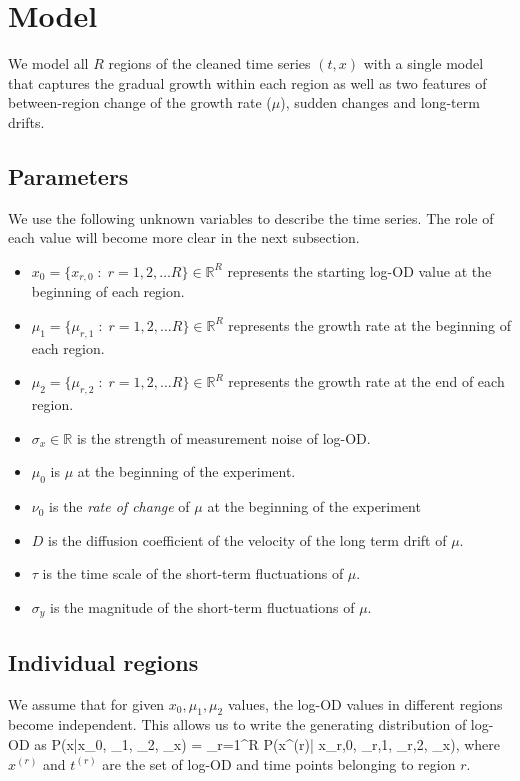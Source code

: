 \section{Model}

We model all $R$ regions of the cleaned time series $(t, x)$ with a single model that captures the gradual growth within each region as well as two features of between-region change of the growth rate ($\mu$), sudden changes and long-term drifts.

\subsection{Parameters}
We use the following unknown variables to describe the time series. The role of each value will become more clear in the next subsection.
\begin{itemize}
	\item $x_0 = \{x_{r,0}\;:\;r=1,2,\ldots R\} \in \mathds{R}^R$ represents the starting log-OD value at the beginning of each region.
	\item $\mu_1 = \{\mu_{r,1}\;:\;r=1,2,\ldots R\} \in \mathds{R}^R$  represents the growth rate at the beginning of each region.
	\item $\mu_2 = \{\mu_{r,2}\;:\;r=1,2,\ldots R\} \in \mathds{R}^R$  represents the growth rate at the end of each region.
	\item $\sigma_x \in \mathds{R}$ is the strength of measurement noise of log-OD.
	\item $\mu_0$ is $\mu$ at the beginning of the experiment.
	\item $\nu_0$ is the \emph{rate of change} of $\mu$ at the beginning of the experiment
	\item $D$ is the diffusion coefficient of the velocity of the long term drift of $\mu$.
	\item $\tau$ is the time scale of the short-term fluctuations of $\mu$.
	\item $\sigma_y$ is the magnitude of the short-term fluctuations of $\mu$.
\end{itemize}


\subsection{Individual regions}
We assume that for given $x_0, \mu_1, \mu_2$ values, the log-OD values in different regions become independent. This allows us to write the generating distribution of log-OD as 
\be
	P(x\;|\;x_0, \mu_1, \mu_2, \sigma_x) = \prod_{r=1}^R P(x^{(r)}\;|\; x_{r,0}, \mu_{r,1}, \mu_{r,2}, \sigma_x)\quad ,
\ee
where $x^{(r)}$ and $t^{(r)}$ are the set of log-OD and time points belonging to region $r$.

